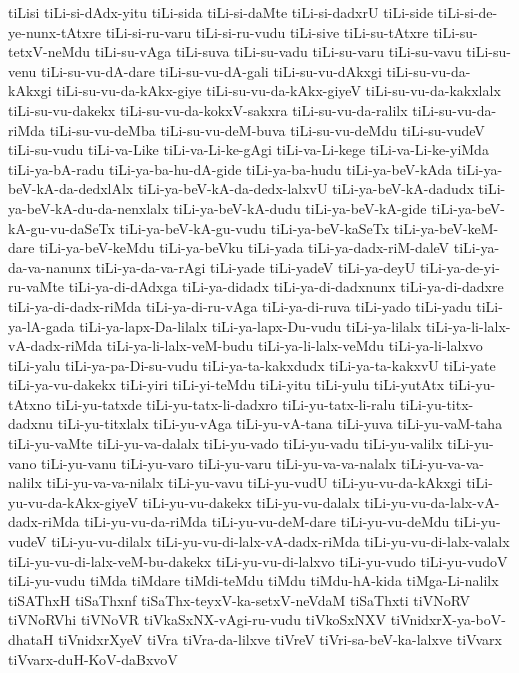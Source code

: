 {tiLisi
tiLi-si-dAdx-yitu
tiLi-sida
tiLi-si-daMte
tiLi-si-dadxrU
tiLi-side
tiLi-si-de-ye-nunx-tAtxre
tiLi-si-ru-varu
tiLi-si-ru-vudu
tiLi-sive
tiLi-su-tAtxre
tiLi-su-tetxV-neMdu
tiLi-su-vAga
tiLi-suva
tiLi-su-vadu
tiLi-su-varu
tiLi-su-vavu
tiLi-su-venu
tiLi-su-vu-dA-dare
tiLi-su-vu-dA-gali
tiLi-su-vu-dAkxgi
tiLi-su-vu-da-kAkxgi
tiLi-su-vu-da-kAkx-giye
tiLi-su-vu-da-kAkx-giyeV
tiLi-su-vu-da-kakxlalx
tiLi-su-vu-dakekx
tiLi-su-vu-da-kokxV-sakxra
tiLi-su-vu-da-ralilx
tiLi-su-vu-da-riMda
tiLi-su-vu-deMba
tiLi-su-vu-deM-buva
tiLi-su-vu-deMdu
tiLi-su-vudeV
tiLi-su-vudu
tiLi-va-Like
tiLi-va-Li-ke-gAgi
tiLi-va-Li-kege
tiLi-va-Li-ke-yiMda
tiLi-ya-bA-radu
tiLi-ya-ba-hu-dA-gide
tiLi-ya-ba-hudu
tiLi-ya-beV-kAda
tiLi-ya-beV-kA-da-dedxlAlx
tiLi-ya-beV-kA-da-dedx-lalxvU
tiLi-ya-beV-kA-dadudx
tiLi-ya-beV-kA-du-da-nenxlalx
tiLi-ya-beV-kA-dudu
tiLi-ya-beV-kA-gide
tiLi-ya-beV-kA-gu-vu-daSeTx
tiLi-ya-beV-kA-gu-vudu
tiLi-ya-beV-kaSeTx
tiLi-ya-beV-keM-dare
tiLi-ya-beV-keMdu
tiLi-ya-beVku
tiLi-yada
tiLi-ya-dadx-riM-daleV
tiLi-ya-da-va-nanunx
tiLi-ya-da-va-rAgi
tiLi-yade
tiLi-yadeV
tiLi-ya-deyU
tiLi-ya-de-yi-ru-vaMte
tiLi-ya-di-dAdxga
tiLi-ya-didadx
tiLi-ya-di-dadxnunx
tiLi-ya-di-dadxre
tiLi-ya-di-dadx-riMda
tiLi-ya-di-ru-vAga
tiLi-ya-di-ruva
tiLi-yado
tiLi-yadu
tiLi-ya-lA-gada
tiLi-ya-lapx-Da-lilalx
tiLi-ya-lapx-Du-vudu
tiLi-ya-lilalx
tiLi-ya-li-lalx-vA-dadx-riMda
tiLi-ya-li-lalx-veM-budu
tiLi-ya-li-lalx-veMdu
tiLi-ya-li-lalxvo
tiLi-yalu
tiLi-ya-pa-Di-su-vudu
tiLi-ya-ta-kakxdudx
tiLi-ya-ta-kakxvU
tiLi-yate
tiLi-ya-vu-dakekx
tiLi-yiri
tiLi-yi-teMdu
tiLi-yitu
tiLi-yulu
tiLi-yutAtx
tiLi-yu-tAtxno
tiLi-yu-tatxde
tiLi-yu-tatx-li-dadxro
tiLi-yu-tatx-li-ralu
tiLi-yu-titx-dadxnu
tiLi-yu-titxlalx
tiLi-yu-vAga
tiLi-yu-vA-tana
tiLi-yuva
tiLi-yu-vaM-taha
tiLi-yu-vaMte
tiLi-yu-va-dalalx
tiLi-yu-vado
tiLi-yu-vadu
tiLi-yu-valilx
tiLi-yu-vano
tiLi-yu-vanu
tiLi-yu-varo
tiLi-yu-varu
tiLi-yu-va-va-nalalx
tiLi-yu-va-va-nalilx
tiLi-yu-va-va-nilalx
tiLi-yu-vavu
tiLi-yu-vudU
tiLi-yu-vu-da-kAkxgi
tiLi-yu-vu-da-kAkx-giyeV
tiLi-yu-vu-dakekx
tiLi-yu-vu-dalalx
tiLi-yu-vu-da-lalx-vA-dadx-riMda
tiLi-yu-vu-da-riMda
tiLi-yu-vu-deM-dare
tiLi-yu-vu-deMdu
tiLi-yu-vudeV
tiLi-yu-vu-dilalx
tiLi-yu-vu-di-lalx-vA-dadx-riMda
tiLi-yu-vu-di-lalx-valalx
tiLi-yu-vu-di-lalx-veM-bu-dakekx
tiLi-yu-vu-di-lalxvo
tiLi-yu-vudo
tiLi-yu-vudoV
tiLi-yu-vudu
tiMda
tiMdare
tiMdi-teMdu
tiMdu
tiMdu-hA-kida
tiMga-Li-nalilx
tiSAThxH
tiSaThxnf
tiSaThx-teyxV-ka-setxV-neVdaM
tiSaThxti
tiVNoRV
tiVNoRVhi
tiVNoVR
tiVkaSxNX-vAgi-ru-vudu
tiVkoSxNXV
tiVnidxrX-ya-boV-dhataH
tiVnidxrXyeV
tiVra
tiVra-da-lilxve
tiVreV
tiVri-sa-beV-ka-lalxve
tiVvarx
tiVvarx-duH-KoV-daBxvoV
}
